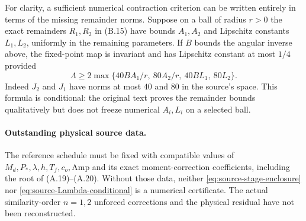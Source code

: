 For clarity, a sufficient numerical contraction criterion can be
written entirely in terms of the missing remainder norms.
Suppose on a ball of radius $r>0$ the exact remainders
$R_1,R_2$ in (B.15) have bounds $A_1,A_2$ and Lipschitz
constants $L_1,L_2$, uniformly in the remaining parameters.
If $B$ bounds the angular inverse above, the fixed-point map
is invariant and has Lipschitz constant at most $1/4$
provided
\begin{equation}\label{eq:source-Lambda-conditional}
\Lambda\ge
2\max\{40BA_1/r,\ 80A_2/r,\ 40BL_1,\ 80L_2\}.
\end{equation}
Indeed $J_2$ and $J_1$ have norms at most $40$ and $80$
in the source's space. This formula is conditional:
the original text proves the remainder bounds qualitatively
but does not freeze numerical $A_i,L_i$ on a selected ball.

\paragraph{Outstanding physical source data.}
The reference schedule must be fixed with compatible values of
$M_d,P_*,\lambda,h,T_f,c_o,\mathrm{Amp}$ and its exact
moment-correction coefficients, including the root of
(A.19)--(A.20). Without those data, neither
\eqref{eq:source-stage-enclosure} nor
\eqref{eq:source-Lambda-conditional} is a numerical certificate.
The actual similarity-order $n=1,2$ unforced corrections and the
physical residual have not been reconstructed.
